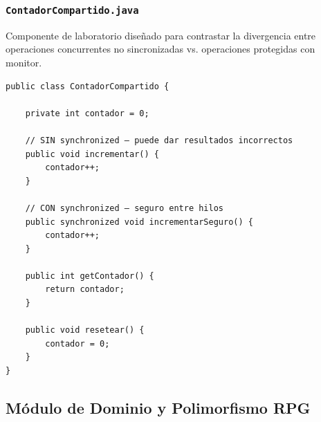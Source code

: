 \documentclass[11pt,letterpaper]{article}
\begin{document}
\subsubsection{\texttt{ContadorCompartido.java}}
Componente de laboratorio diseñado para contrastar la divergencia entre operaciones concurrentes no sincronizadas vs. operaciones protegidas con monitor.
\begin{lstlisting}[style=JavaStyle]
public class ContadorCompartido {

    private int contador = 0;

    // SIN synchronized — puede dar resultados incorrectos
    public void incrementar() {
        contador++;
    }

    // CON synchronized — seguro entre hilos
    public synchronized void incrementarSeguro() {
        contador++;
    }

    public int getContador() {
        return contador;
    }

    public void resetear() {
        contador = 0;
    }
}
\end{lstlisting}

\subsection{Módulo de Dominio y Polimorfismo RPG}
\end{document}

